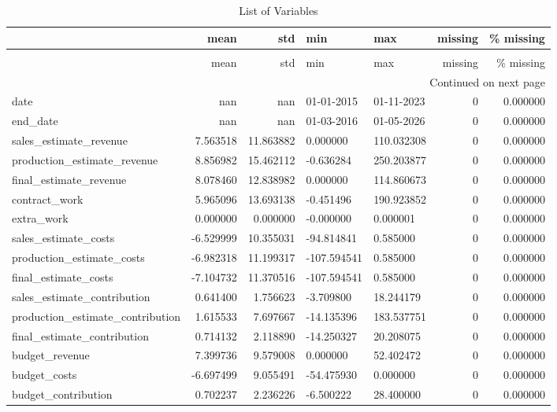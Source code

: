 \begin{landscape}\begin{longtable}[h!]{lrrllrr}
\caption{List of Variables} \label{eda_1} \\
\toprule
 & mean & std & min & max & missing & \% missing \\
\midrule
\endfirsthead
\caption[]{List of Variables} \\
\toprule
 & mean & std & min & max & missing & \% missing \\
\midrule
\endhead
\midrule
\multicolumn{7}{r}{Continued on next page} \\
\midrule
\endfoot
\bottomrule
\endlastfoot
date & nan & nan & 01-01-2015 & 01-11-2023 & 0 & 0.000000 \\
end_date & nan & nan & 01-03-2016 & 01-05-2026 & 0 & 0.000000 \\
sales_estimate_revenue & 7.563518 & 11.863882 & 0.000000 & 110.032308 & 0 & 0.000000 \\
production_estimate_revenue & 8.856982 & 15.462112 & -0.636284 & 250.203877 & 0 & 0.000000 \\
final_estimate_revenue & 8.078460 & 12.838982 & 0.000000 & 114.860673 & 0 & 0.000000 \\
contract_work & 5.965096 & 13.693138 & -0.451496 & 190.923852 & 0 & 0.000000 \\
extra_work & 0.000000 & 0.000000 & -0.000000 & 0.000001 & 0 & 0.000000 \\
sales_estimate_costs & -6.529999 & 10.355031 & -94.814841 & 0.585000 & 0 & 0.000000 \\
production_estimate_costs & -6.982318 & 11.199317 & -107.594541 & 0.585000 & 0 & 0.000000 \\
final_estimate_costs & -7.104732 & 11.370516 & -107.594541 & 0.585000 & 0 & 0.000000 \\
sales_estimate_contribution & 0.641400 & 1.756623 & -3.709800 & 18.244179 & 0 & 0.000000 \\
production_estimate_contribution & 1.615533 & 7.697667 & -14.135396 & 183.537751 & 0 & 0.000000 \\
final_estimate_contribution & 0.714132 & 2.118890 & -14.250327 & 20.208075 & 0 & 0.000000 \\
budget_revenue & 7.399736 & 9.579008 & 0.000000 & 52.402472 & 0 & 0.000000 \\
budget_costs & -6.697499 & 9.055491 & -54.475930 & 0.000000 & 0 & 0.000000 \\
budget_contribution & 0.702237 & 2.236226 & -6.500222 & 28.400000 & 0 & 0.000000 \\

\end{longtable}
\end{landscape}
